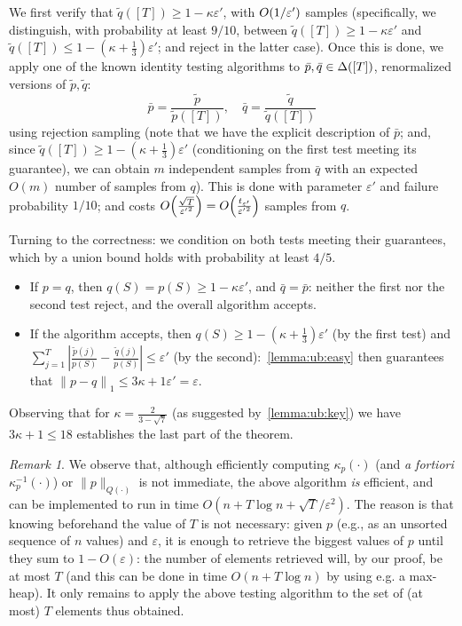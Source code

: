 \documentclass[11pt]{article}
\theoremstyle{remark}   	\newtheorem{remark}[theorem]{Remark}
\theoremstyle{definition}   	\newaliascnt{defn}{theorem}
\newcommand{\newest}[1]{{{#1}}}
\newcommand{\eps}{\ensuremath{\varepsilon}\xspace}
\newcommand{\bigO}[1]{{O\mleft( #1 \mright)}}
\newcommand{\norm}[1]{\lVert#1{\rVert}}
\newcommand{\normone}[1]{{\norm{#1}}_1}
\newcommand{\abs}[1]{\left\lvert #1 \right\rvert}
\newcommand{\kf}[1]{\kappa_{#1}}
\begin{document}
    We first verify that $\tilde{q}([T]) \geq 1-\kappa\eps'$, with $\bigO{{1}/{\eps'}}$ samples (specifically, we distinguish, with probability at least $9/10$, between $\tilde{q}([T]) \geq 1-\kappa\eps'$ and $\tilde{q}([T]) \leq 1-(\kappa+\tfrac{1}{3})\eps'$; and reject in the latter case). Once this is done, we apply one of the known identity testing algorithms to $\bar{p},\bar{q}\in\Delta\!\left([T]\right)$, renormalized versions of $\tilde{p},\tilde{q}$:
\[
    \bar{p} = \frac{\tilde{p}}{\tilde{p}([T])},\quad \bar{q} = \frac{\tilde{q}}{\tilde{q}([T])}
\]
using rejection sampling (note that we have the explicit description of $\bar{p}$; and, since $\tilde{q}([T]) \geq 1-(\kappa+\tfrac{1}{3})\eps'$ (conditioning on the first test meeting its guarantee), we can obtain $m$ independent samples
from $\bar{q}$ with an expected $O(m)$ number of samples from $q$). This is done with parameter $\eps'$ and failure probability $1/10$; and costs $\bigO{\frac{\sqrt{T}}{{\eps'}^2}}=\bigO{\frac{t_{\eps'}}{{\eps'}^{2}}}$ samples from $q$.

Turning to the correctness: we condition on both tests meeting their guarantees, which by a union bound holds with probability at least $4/5$.
\begin{itemize}
  \item If $p=q$, then $q(S) = p(S) \geq 1-\kappa\eps'$, and $\bar{q}=\bar{p}$: neither the first nor the second test reject, and the overall algorithm accepts.
  \item If the algorithm accepts, then $q(S) \geq 1-(\kappa+\tfrac{1}{3})\eps'$ (by the first test) and $\sum_{j=1}^T \abs{ \frac{\tilde{p}(j)}{p(S)} - \frac{\tilde{q}(j)}{p(S)} } \leq \eps'$ (by the second):~\autoref{lemma:ub:easy} then guarantees that $\normone{p-q} \leq 3\kappa+1 \eps' = \eps$.
\end{itemize}
Observing that for $\kappa=\frac{2}{3-\sqrt{7}}$ (as suggested by~\autoref{lemma:ub:key}) we have $3\kappa+1\leq 18$ establishes the last part of the theorem.

\begin{remark}
  \newest{We observe that, although efficiently computing $\kf{p}(\cdot)$ (and \textit{a fortiori} $\kf{p}^{-1}(\cdot)$) or $\norm{p}_{Q(\cdot)}$ is not immediate, the above algorithm \emph{is} efficient, and can be implemented to run in time $O(n+T\log n+\sqrt{T}/\eps^2)$. The reason is that knowing beforehand the value of $T$ is not necessary: given $p$ (e.g., as an unsorted sequence of $n$ values) and $\eps$, it is enough to retrieve the biggest values of $p$ until they sum to $1-O(\eps)$: the number of elements retrieved will, by our proof, be at most $T$ (and this can be done in time $O(n+T\log n)$ by using e.g. a max-heap). It only remains to apply the above testing algorithm to the set of (at most) $T$ elements thus obtained.}
\end{remark}
\end{document}
